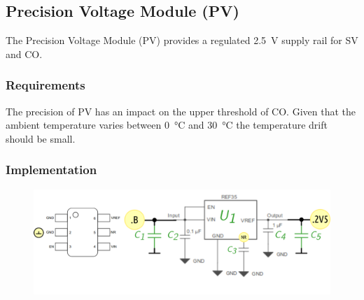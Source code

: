 \subsection{Precision Voltage Module (PV) }
\label{sec:PV}

The Precision Voltage Module (PV) provides a regulated \SI{2.5}{\volt} supply rail for SV and CO.


\subsubsection{Requirements}

The precision of PV has an impact on the upper threshold of CO. Given that the ambient temperature
varies between  \SI{0}{\degreeCelsius}  and  \SI{30}{\degreeCelsius} the temperature drift should be small.


\subsubsection{Implementation}


\begin{figure}[h]
    \centering
    \includegraphics[width=1.0\textwidth]{PO/PV/PV}
\end{figure}



\clearpage
